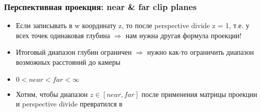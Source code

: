 \documentclass[10pt]{beamer}
\begin{document}
\begin{frame}[fragile]
\frametitle{Перспективная проекция: near \& far clip planes}
\begin{itemize}
\item Если записывать в w координату z, то после perspective divide z = 1, т.е. у всех точек одинаковая глубина \begin{math}\Rightarrow\end{math} нам нужна другая формула проекции!
\pause
\item Итоговый диапазон глубин ограничен \begin{math}\Rightarrow\end{math} нужно как-то ограничить диапазон возможных расстояний до камеры
\pause
\item \begin{math}0 < near < far < \infty\end{math}
\pause
\item Хотим, чтобы диапазон \begin{math}z\in [near,far]\end{math} после применения матрицы проекции и perspective divide превратился в \begin{math}[-1,1]\end{math}
\end{itemize}
\end{frame}
\end{document}
